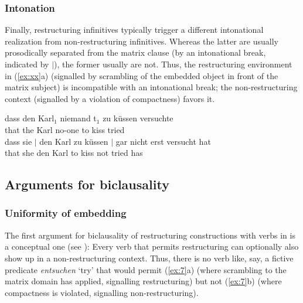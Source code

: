 \documentclass[output=paper]{langsci/langscibook}
\begin{document}
\subsubsection{\label{m7}Intonation}

Finally, restructuring infinitives typically trigger a different intonational
realization from non-restructuring infinitives. Whereas the latter are usually
prosodically separated from the matrix clause (by an intonational break,
indicated by $|$), the former usually are not. Thus, the restructuring
environment in (\ref{ex:xx}a) (signalled by scrambling of the embedded object
in front of the matrix subject) is incompatible with an intonational break; the
non-restructuring context (signalled by a violation of compactness) favors it.

\ea\label{ex:xx} 
    \ea \gll dass den Karl$_1$  niemand t$_1$ zu küssen versuchte\\
    that the Karl\textsubscript{\Acc} no-one\textsubscript{\Nom} {}  to kiss tried\\
    \ex \gll dass sie $|$ den Karl zu küssen $|$  gar nicht erst versucht hat\\
    that she\textsubscript{\Nom} {} den Karl\textsubscript{\Acc} to kiss {} \Ptcl{} not \Ptcl{} tried has\\
    \z
\z

\subsection{Arguments for biclausality}

\subsubsection{\label{b1}Uniformity of embedding}

The first argument for biclausality of restructuring constructions with 
verbs in  is a conceptual one (see
\citealt{Koster:87,Stechow&Sternefeld:88}): Every  verb that permits
restructuring can optionally also show up in a non-restructuring context. Thus,
there is no  verb like, say, a fictive predicate {\it entsuchen}
\enquote*{try} that would permit (\ref{ex:7}a) (where scrambling to the matrix
domain has applied, signalling restructuring) but not (\ref{ex:7}b) (where
compactness is violated, signalling non-restructuring).

\ea\label{ex:7} 
    \z
\z
\end{document}
